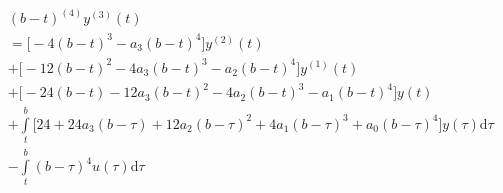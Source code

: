 \documentclass[letterpaper%
, twoside%
, 12pt%
,memoire%
, english%
,creativecommons,hyperref%
]{thETS}
\theoremstyle{newThmStyle}
\begin{document}
\begin{equation}\label{eqn:A6}
\begin{split}
	&(b-t)^{(4)}y^{(3)}(t)\\
	&=\bigg[-4(b-t)^{3} - a_3(b-t)^{4}\bigg]y^{(2)}(t)\\
	&+\bigg[-12(b-t)^{2}-4a_3(b-t)^{3}-a_2(b-t)^{4}\bigg]y^{(1)}(t)\\
	&+\bigg[-24(b-t)-12a_3(b-t)^{2}-4a_2(b-t)^{3}-a_1(b-t)^{4}\bigg]y(t)\\
	&+\int\limits_{t}^{b}\bigg[24+24a_3(b-\tau)+12a_2(b-\tau)^{2}+4a_1(b-\tau)^{3}+a_0(b-\tau)^{4}\bigg]y(\tau)\mathrm{d}\tau\\
	&-\int\limits_{t}^{b}(b-\tau)^{4}u(\tau)\mathrm{d}\tau
\end{split}
\end{equation}

%
%
%
%
%
\end{document}
